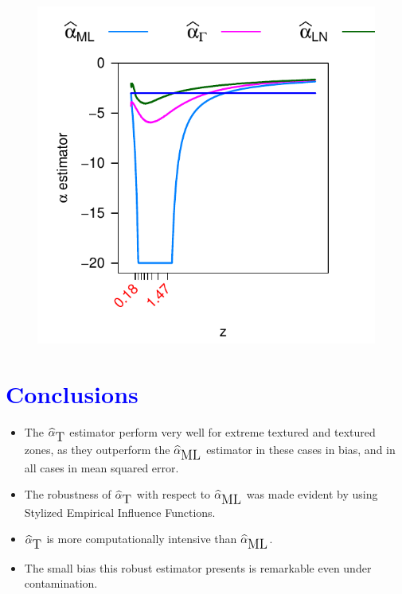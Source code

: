 \documentclass[a0,portrait]{a0poster}
\begin{document}
\begin{multicols}{3}
\begin{center}
	\begin{minipage}[t]{0.96\linewidth}
		\begin{figure}
			\includegraphics[scale=1.1]{../../../../Figures/IVJIAAIS2017/Cont/INFL_LNyMVyGA_alfa-3_L3n9.pdf}
		\end{figure}
	\end{minipage}
\end{center}
\hspace{.05cm}
 
\section*{\textcolor{blue}{Conclusions}}
\begin{itemize}
	\item[\textcolor{red}{\textbullet}] The $\widehat{\alpha}_{\text{\tiny{T}}}$ estimator perform very well for extreme textured and textured zones, as they outperform the $\widehat{\alpha}_{\text{\tiny{ML}}}$ estimator in these cases in bias, and in all cases in mean squared error.
	\item[\textcolor{red}{\textbullet}] The robustness of $\widehat\alpha_{\text{\tiny{T}}}$ with respect to $\widehat\alpha_{\text{\tiny{ML}}}$ was made evident by using Stylized Empirical Influence Functions.
	\item[\textcolor{red}{\textbullet}] $\widehat\alpha_{\text{\tiny{T}}}$ is more computationally intensive than $\widehat\alpha_{\text{\tiny{ML}}}$.
	\item[\textcolor{red}{\textbullet}] The small bias this robust estimator presents is remarkable even under contamination.
\end{itemize}






\end{multicols}
\end{document}
